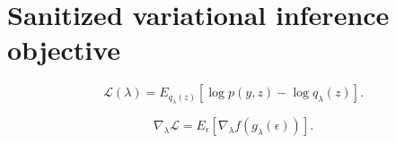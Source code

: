 \section{Sanitized variational inference objective}

\begin{equation}\label{eq:dept-elbo}
\mathcal L(\lambda)=E_{q_\lambda(z)}[\log p(y,z)-\log q_\lambda(z)].
\end{equation}

\begin{equation}\label{eq:dept-reparameterization-gradient}
\nabla_\lambda \mathcal L = E_\epsilon[\nabla_\lambda f(g_\lambda(\epsilon))].
\end{equation}
